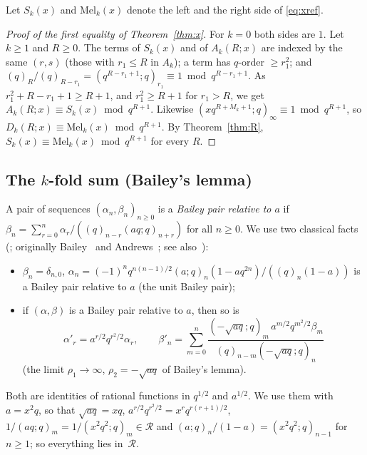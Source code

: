 \documentclass[11pt]{amsart}
\theoremstyle{definition}
\numberwithin{equation}{section}
\newcommand{\R}{\mathcal{R}}
\newcommand{\Mel}{\mathrm{Mel}}
\begin{document}
Let $S_k(x)$ and $\Mel_k(x)$ denote the left and the right side of \eqref{eq:xref}.

\begin{proof}[Proof of the first equality of Theorem~\ref{thm:x}]
For $k=0$ both sides are $1$. Let $k\ge1$ and $R\ge0$. The terms of $S_k(x)$ and of $A_k(R;x)$ are
indexed by the same $(r,s)$ (those with $r_1\le R$ in $A_k$); a term has $q$-order $\ge r_1^2$; and
$(q)_R/(q)_{R-r_1}=(q^{R-r_1+1};q)_{r_1}\equiv1\bmod q^{R-r_1+1}$. As $r_1^2+R-r_1+1\ge R+1$, and
$r_1^2\ge R+1$ for $r_1>R$, we get $A_k(R;x)\equiv S_k(x)\bmod q^{R+1}$. Likewise
$(xq^{R+M_k+1};q)_\infty\equiv1\bmod q^{R+1}$, so $D_k(R;x)\equiv\Mel_k(x)\bmod q^{R+1}$. By
Theorem~\ref{thm:R}, $S_k(x)\equiv\Mel_k(x)\bmod q^{R+1}$ for every $R$.
\end{proof}

\subsection{The $k$-fold sum (Bailey's lemma)}
A pair of sequences $(\alpha_n,\beta_n)_{n\ge0}$ is a \emph{Bailey pair relative to $a$} if
$\beta_n=\sum_{r=0}^n\alpha_r/((q)_{n-r}(aq;q)_{n+r})$ for all $n\ge0$. We use two classical
facts (\cite[§1 and §3]{BIS}; originally Bailey~\cite{Bailey} and Andrews~\cite{Andrews1984}; see
also~\cite{Warnaar50}):
\begin{itemize}[leftmargin=2em]
\item[(U)] $\beta_n=\delta_{n,0}$, $\alpha_n=(-1)^nq^{n(n-1)/2}(a;q)_n(1-aq^{2n})/((q)_n(1-a))$ is a Bailey
pair relative to $a$ (the unit Bailey pair);
\item[(S)] if $(\alpha,\beta)$ is a Bailey pair relative to $a$, then so is
\[\alpha'_r=a^{r/2}q^{r^2/2}\alpha_r,\qquad \beta'_n=\sum_{m=0}^{n}\frac{(-\sqrt{aq};q)_m\, a^{m/2}q^{m^2/2}\beta_m}{(q)_{n-m}(-\sqrt{aq};q)_n}\]
(the limit $\rho_1\to\infty$, $\rho_2=-\sqrt{aq}$ of Bailey's lemma).
\end{itemize}
Both are identities of rational functions in $q^{1/2}$ and $a^{1/2}$. We use them with $a=x^2q$, so
that $\sqrt{aq}=xq$, $a^{r/2}q^{r^2/2}=x^rq^{r(r+1)/2}$, $1/(aq;q)_m=1/(x^2q^2;q)_m\in\R$ and
$(a;q)_n/(1-a)=(x^2q^2;q)_{n-1}$ for $n\ge1$; so everything lies in~$\R$.
\end{document}
